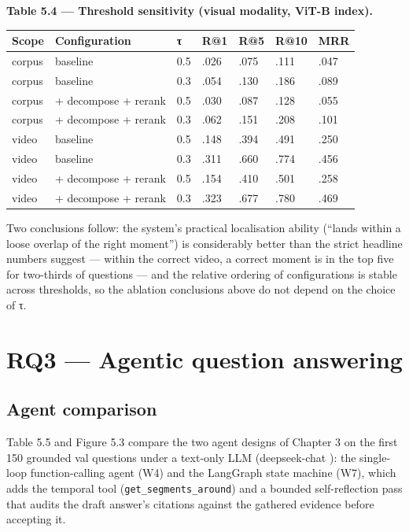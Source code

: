 \textbf{Table 5.4 --- Threshold sensitivity (visual modality, ViT-B
index).}

\begin{longtable}[]{@{}lllllll@{}}
\toprule\noalign{}
Scope & Configuration & τ & R@1 & R@5 & R@10 & MRR \\
\midrule\noalign{}
\endhead
\bottomrule\noalign{}
\endlastfoot
corpus & baseline & 0.5 & .026 & .075 & .111 & .047 \\
corpus & baseline & 0.3 & .054 & .130 & .186 & .089 \\
corpus & + decompose + rerank & 0.5 & .030 & .087 & .128 & .055 \\
corpus & + decompose + rerank & 0.3 & .062 & .151 & .208 & .101 \\
video & baseline & 0.5 & .148 & .394 & .491 & .250 \\
video & baseline & 0.3 & .311 & .660 & .774 & .456 \\
video & + decompose + rerank & 0.5 & .154 & .410 & .501 & .258 \\
video & + decompose + rerank & 0.3 & .323 & .677 & .780 & .469 \\
\end{longtable}

Two conclusions follow: the system's practical localisation ability
(``lands within a loose overlap of the right moment'') is considerably
better than the strict headline numbers suggest --- within the correct
video, a correct moment is in the top five for two-thirds of questions
--- and the relative ordering of configurations is stable across
thresholds, so the ablation conclusions above do not depend on the
choice of τ.

\section{RQ3 --- Agentic question
answering}

\subsection{Agent comparison}

Table 5.5 and Figure 5.3 compare the two agent designs of Chapter 3 on
the first 150 grounded val questions under a text-only LLM
(deepseek-chat \autocite{deepseek2024v3}): the single-loop
function-calling agent (W4) and the LangGraph state machine (W7), which
adds the temporal tool (\texttt{get\_segments\_around}) and a bounded
self-reflection pass that audits the draft answer's citations against
the gathered evidence before accepting it.

